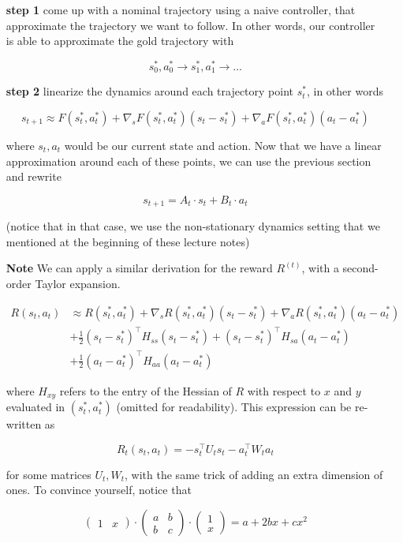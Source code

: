 \documentclass{article}
\begin{document}
\begin{itemize}
\item[\textbf{step 1}] come up with a nominal trajectory using a naive controller, that approximate the trajectory we want to follow. In other words, our controller is able to approximate the gold trajectory with 

\[ s_0^*, a_0^* \rightarrow  s_1^*, a_1^* \rightarrow \dots \]
\item[\textbf{step 2}] linearize the dynamics around each trajectory point $ s_t^* $, in other words

\[  s_{t+1} \approx F(s_t^*, a_t^*) + \nabla_s F(s_t^*, a_t^*) (s_t - s_t^*) + \nabla_a F(s_t^*, a_t^*) (a_t - a_t^*) \]

where $ s_t, a_t $ would be our current state and action. Now that we have a linear approximation around each of these points, we can use the previous section and rewrite 

\[ s_{t+1}  = A_t \cdot s_t + B_t \cdot a_t \]

(notice that in that case, we use the non-stationary dynamics setting that we mentioned at the beginning of these lecture notes)

\textbf{Note} We can apply a similar derivation for the reward $ R^{(t)} $, with a second-order Taylor expansion.


\begin{align*}
	R (s_t, a_t) &\approx  R (s_{t}^*, a_{t}^*)   + \nabla_s R (s_t^*, a_t^*) (s_t - s_t^*) + \nabla_a R(s_t^*, a_t^*) (a_t - a_t^*) \\
	&+ \frac{1}{2} (s_t - s_t^*)^\top H_{ss}(s_t - s_t^*) +  (s_t - s_t^*)^\top H_{sa} (a_t - a_t^*) \\&+ \frac{1}{2}(a_t - a_t^*)^\top H_{aa} (a_t - a_t^*)
\end{align*}

where $ H_{xy} $ refers to the entry of the Hessian of $ R $ with respect to $ x $ and $ y $ evaluated in $  (s_t^*, a_t^*)  $ (omitted for readability). This expression can be re-written as

\[ R_t(s_t, a_t) = - s_t^\top U_t s_t - a_t^\top W_t a_t   \]

for some matrices $ U_t, W_t $, with the same trick of adding an extra dimension of ones. To convince yourself, notice that 

\[ \begin{pmatrix}
1 & x
\end{pmatrix} \cdot \begin{pmatrix}
a & b\\b & c
\end{pmatrix} \cdot \begin{pmatrix}
1 \\ x
\end{pmatrix} = a + 2bx + c x^2 \]


\end{itemize}
\end{document}
